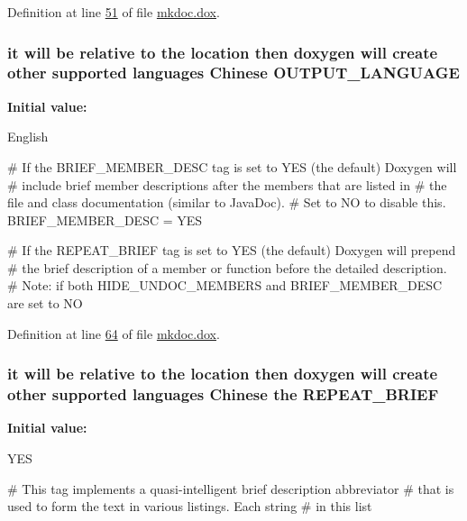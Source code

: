 Definition at line \hyperlink{mkdoc_8dox_source_l00051}{51} of file \hyperlink{mkdoc_8dox_source}{mkdoc.\-dox}.

\hypertarget{mkdoc_8dox_a70b2dc2bbbd06aad351734d9f602edd0}{
\subsubsection[{O\-U\-T\-P\-U\-T\-\_\-\-L\-A\-N\-G\-U\-A\-G\-E}]{\setlength{\rightskip}{0pt plus 5cm}it will be relative to the location then doxygen will create other supported languages {\bf Chinese} O\-U\-T\-P\-U\-T\-\_\-\-L\-A\-N\-G\-U\-A\-G\-E}}\label{mkdoc_8dox_a70b2dc2bbbd06aad351734d9f602edd0}
{\bfseries Initial value\-:}
\begin{DoxyCode}
 English

\textcolor{preprocessor}{# If the BRIEF\_MEMBER\_DESC tag is set to YES (the default) Doxygen will }
\textcolor{preprocessor}{}\textcolor{preprocessor}{# include brief member descriptions after the members that are listed in }
\textcolor{preprocessor}{}\textcolor{preprocessor}{# the file and class documentation (similar to JavaDoc). }
\textcolor{preprocessor}{}\textcolor{preprocessor}{# Set to NO to disable this.}
\textcolor{preprocessor}{}
BRIEF\_MEMBER\_DESC      = YES

\textcolor{preprocessor}{# If the REPEAT\_BRIEF tag is set to YES (the default) Doxygen will prepend }
\textcolor{preprocessor}{}\textcolor{preprocessor}{# the brief description of a member or function before the detailed
       description. }
\textcolor{preprocessor}{# Note: if both HIDE\_UNDOC\_MEMBERS and BRIEF\_MEMBER\_DESC are set to NO}
\end{DoxyCode}


Definition at line \hyperlink{mkdoc_8dox_source_l00064}{64} of file \hyperlink{mkdoc_8dox_source}{mkdoc.\-dox}.

\hypertarget{mkdoc_8dox_a97488cf1b604b4e0594c9a044197735c}{
\subsubsection[{R\-E\-P\-E\-A\-T\-\_\-\-B\-R\-I\-E\-F}]{\setlength{\rightskip}{0pt plus 5cm}it will be relative to the location then doxygen will create other supported languages {\bf Chinese} the R\-E\-P\-E\-A\-T\-\_\-\-B\-R\-I\-E\-F}}\label{mkdoc_8dox_a97488cf1b604b4e0594c9a044197735c}
{\bfseries Initial value\-:}
\begin{DoxyCode}
 YES

\textcolor{preprocessor}{# This tag implements a quasi-intelligent brief description abbreviator }
\textcolor{preprocessor}{}\textcolor{preprocessor}{# that is used to form the text in various listings. Each string }
\textcolor{preprocessor}{# in this list}
\end{DoxyCode}


